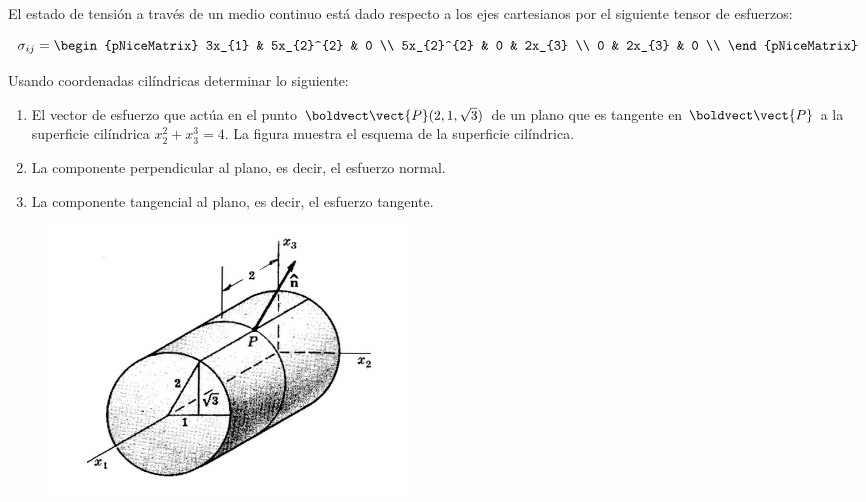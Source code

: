 \documentclass[../main.tex]{subfiles}
\begin{document}
\begin{problema}
	El estado de tensión a través de un medio continuo está dado respecto
	a los ejes cartesianos por el siguiente tensor de esfuerzos:

	\begin{equation*}
		\sigma_{ij} =
		\begin{pNiceMatrix}
			3x_{1}     & 5x_{2}^{2} & 0      \\
			5x_{2}^{2} & 0          & 2x_{3} \\
			0          & 2x_{3}     & 0      \\
		\end{pNiceMatrix}
	\end{equation*}

	Usando coordenadas cilíndricas determinar lo siguiente:

	\begin{enumerate}
		\item El vector de esfuerzo que actúa en el punto \(\boldvect\vect{P}(2, 1, \sqrt{3})\) de
		      un plano que es tangente en \(\boldvect\vect{P}\) a la superficie cilíndrica
		      \(x_{2}^{2} + x_{3}^{3} = 4\). La figura muestra el esquema de la superficie
		      cilíndrica.
		\item La componente perpendicular al plano, es decir, el esfuerzo normal.
		\item La componente tangencial al plano, es decir, el esfuerzo tangente.
	\end{enumerate}

	\begin{figure}[htb]
		\centering
		\includegraphics[width=.45\textwidth]{figs/problema02-001.jpg}
	\end{figure}
\end{problema}
\end{document}
